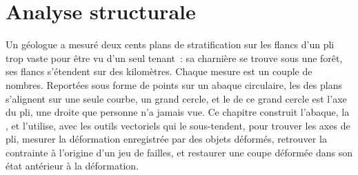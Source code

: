 \chapter{Analyse structurale}\label{ch:b3:structural-analysis}

Un géologue a mesuré deux cents plans de stratification sur les flancs d'un pli
trop vaste pour être vu d'un seul tenant~: sa charnière se trouve sous une forêt, ses flancs s'étendent sur
des kilomètres. Chaque mesure est un couple de nombres. Reportées sous forme de points sur un abaque circulaire,
les  des plans s'alignent sur une seule courbe, un grand cercle, et
le  de ce grand cercle est l'axe du pli, une droite que personne n'a
jamais vue. Ce chapitre construit l'abaque, la , et
l'utilise, avec les outils vectoriels qui le sous-tendent, pour trouver les axes de pli, mesurer la
déformation enregistrée par des objets déformés, retrouver la contrainte à l'origine d'un jeu de
failles, et restaurer une coupe déformée dans son état antérieur à la
déformation.

